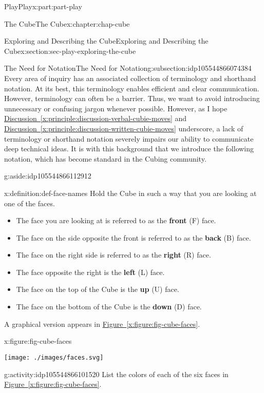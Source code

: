 \documentclass[oneside,10pt,]{book}
\newcommand{\xreffont}{\relax}
\newcommand{\terminology}[1]{\textbf{#1}}
\numberwithin{equation}{section}
\begin{document}
\begin{partptx}{Play}{}{Play}{}{}{x:part:part-play}
\begin{chapterptx}{The Cube}{}{The Cube}{}{}{x:chapter:chap-cube}
\begin{sectionptx}{Exploring and Describing the Cube}{}{Exploring and Describing the Cube}{}{}{x:section:sec-play-exploring-the-cube}
\begin{subsectionptx}{The Need for Notation}{}{The Need for Notation}{}{}{g:subsection:idp105544866074384}
Every area of inquiry has an associated collection of terminology and shorthand notation. At its best, this terminology enables efficient and clear communication. However, terminology can often be a barrier. Thus, we want to avoid introducing unnecessary or confusing jargon whenever possible. However, as I hope \hyperref[x:principle:discussion-verbal-cubie-moves]{Discussion~{\xreffont\ref{x:principle:discussion-verbal-cubie-moves}}} and \hyperref[x:principle:discussion-written-cubie-moves]{Discussion~{\xreffont\ref{x:principle:discussion-written-cubie-moves}}} underscore, a lack of terminology or shorthand notation severely impairs our ability to communicate deep technical ideas. It is with this background that we introduce the following notation, which has become standard in the Cubing community.\begin{aside}{}{g:aside:idp105544866112912}%
\end{aside}
%
\begin{definition}{}{x:definition:def-face-names}%
Hold the Cube in such a way that you are looking at one of the faces.%
\begin{itemize}[label=\textbullet]
\item{}The face you are looking at is referred to as the \terminology{front} (F) face.%
\item{}The face on the side opposite the front is referred to as the \terminology{back} (B) face.%
\item{}The face on the right side is referred to as the \terminology{right} (R) face.%
\item{}The face opposite the right is the \terminology{left} (L) face.%
\item{}The face on the top of the Cube is the \terminology{up} (U) face.%
\item{}The face on the bottom of the Cube is the \terminology{down} (D) face.%
\end{itemize}
A graphical version appears in \hyperref[x:figure:fig-cube-faces]{Figure~{\xreffont\ref{x:figure:fig-cube-faces}}}.%
\begin{figureptx}{}{x:figure:fig-cube-faces}{}%
\begin{image}{0.25}{0.5}{0.25}%
\texttt{[image: ./images/faces.svg]}
\end{image}%
\tcblower
\end{figureptx}%
\end{definition}
\begin{activity}{}{g:activity:idp105544866101520}%
List the colors of each of the six faces in \hyperref[x:figure:fig-cube-faces]{Figure~{\xreffont\ref{x:figure:fig-cube-faces}}}.%

\end{activity}
\end{subsectionptx}
\end{sectionptx}
\end{chapterptx}
\end{partptx}
\end{document}
